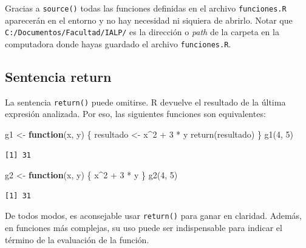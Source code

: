 \documentclass[
]{book}
\newenvironment{Shaded}{\begin{snugshade}}{\end{snugshade}}
\newcommand{\ControlFlowTok}[1]{\textcolor[rgb]{0.13,0.29,0.53}{\textbf{#1}}}
\newcommand{\DecValTok}[1]{\textcolor[rgb]{0.00,0.00,0.81}{#1}}
\newcommand{\FunctionTok}[1]{\textcolor[rgb]{0.00,0.00,0.00}{#1}}
\newcommand{\NormalTok}[1]{#1}
\newcommand{\OtherTok}[1]{\textcolor[rgb]{0.56,0.35,0.01}{#1}}
\newcommand{\SpecialCharTok}[1]{\textcolor[rgb]{0.00,0.00,0.00}{#1}}
\begin{document}
Gracias a \texttt{source()} todas las funciones definidas en el archivo \texttt{funciones.R} aparecerán en el entorno y no hay necesidad ni siquiera de abrirlo. Notar que \texttt{C:/Documentos/Facultad/IALP/} es la dirección o \emph{path} de la carpeta en la computadora donde hayas guardado el archivo \texttt{funciones.R}.

\hypertarget{sentencia-return}{%
\subsection{Sentencia return}\label{sentencia-return}}

La sentencia \texttt{return()} puede omitirse. R devuelve el resultado de la última expresión analizada. Por eso, las siguientes funciones son equivalentes:

\begin{Shaded}
\begin{Highlighting}[]
\NormalTok{g1 }\OtherTok{\textless{}{-}} \ControlFlowTok{function}\NormalTok{(x, y) \{}
\NormalTok{    resultado }\OtherTok{\textless{}{-}}\NormalTok{ x}\SpecialCharTok{\^{}}\DecValTok{2} \SpecialCharTok{+} \DecValTok{3} \SpecialCharTok{*}\NormalTok{ y}
    \FunctionTok{return}\NormalTok{(resultado)}
\NormalTok{\}}
\FunctionTok{g1}\NormalTok{(}\DecValTok{4}\NormalTok{, }\DecValTok{5}\NormalTok{)}
\end{Highlighting}
\end{Shaded}

\begin{verbatim}
[1] 31
\end{verbatim}

\begin{Shaded}
\begin{Highlighting}[]
\NormalTok{g2 }\OtherTok{\textless{}{-}} \ControlFlowTok{function}\NormalTok{(x, y) \{}
\NormalTok{    x}\SpecialCharTok{\^{}}\DecValTok{2} \SpecialCharTok{+} \DecValTok{3} \SpecialCharTok{*}\NormalTok{ y}
\NormalTok{\}}
\FunctionTok{g2}\NormalTok{(}\DecValTok{4}\NormalTok{, }\DecValTok{5}\NormalTok{)}
\end{Highlighting}
\end{Shaded}

\begin{verbatim}
[1] 31
\end{verbatim}

De todos modos, es aconsejable usar \texttt{return()} para ganar en claridad. Además, en funciones más complejas, su uso puede ser indispensable para indicar el término de la evaluación de la función.
\end{document}
